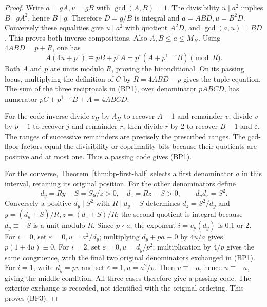 \begin{proof}
Write \(a=gA,u=gB\) with \(\gcd(A,B)=1\). The divisibility
\(u\mid a^2\) implies \(B\mid gA^2\), hence \(B\mid g\).
Therefore \(D=g/B\) is integral and \(a=ABD,u=B^2D\).
Conversely these equalities give \(u\mid a^2\) with quotient
\(A^2D\), and \(\gcd(a,u)=BD\). This proves both inverse
compositions. Also \(A,B\le a\le M_H\).
Using \(4ABD=p+R\), one has
\[
 A(4u+p^\varepsilon)
 \equiv pB+p^\varepsilon A
 =p^\varepsilon(A+p^{1-\varepsilon}B)\pmod R.
\]
Both \(A\) and \(p\) are units modulo \(R\), proving the
biconditional. On its passing locus, multiplying the definition of
\(C\) by \(R=4ABD-p\) gives the tuple equation. The sum of the
three reciprocals in (BP1), over denominator \(pABCD\), has numerator
\(pC+p^{1-\varepsilon}B+A=4ABCD\).

For the code inverse divide \(c_H\) by \(\Lambda_H\) to recover
\(A-1\) and remainder \(v\), divide \(v\) by \(p-1\) to recover
\(j\) and remainder \(r\), then divide \(r\) by 2 to recover
\(B-1\) and \(\varepsilon\). The ranges of successive remainders
are precisely the prescribed ranges. The gcd-floor factors equal
the divisibility or coprimality bits because their quotients are
positive and at most one. Thus a passing code gives (BP1).

For the converse, Theorem~\ref{thm:bp-first-half} selects a first
denominator \(a\) in this interval, retaining its original position.
For the other denominators define
\[
 d_y=Ry-S=Sy/z>0,\quad d_z=Rz-S>0,
 \qquad d_y d_z=S^2.
\]
Conversely a positive \(d_y\mid S^2\) with \(R\mid d_y+S\)
determines \(d_z=S^2/d_y\) and
\(y=(d_y+S)/R,z=(d_z+S)/R\); the second quotient is integral
because \(d_y\equiv-S\) is a unit modulo \(R\).
Since \(p\nmid a\), the exponent \(i=v_p(d_y)\) is 0,1 or 2.
For \(i=0\), set \(\varepsilon=0,u=a^2/d_y\); multiplying
\(d_y+pa\equiv0\) by \(4u/a\) gives \(p(1+4u)\equiv0\).
For \(i=2\), set \(\varepsilon=0,u=d_y/p^2\); multiplication
by \(4/p\) gives the same congruence, with the final two original
denominators exchanged in (BP1). For \(i=1\), write \(d_y=pv\)
and set \(\varepsilon=1,u=a^2/v\). Then \(v\equiv-a\), hence
\(u\equiv-a\), giving the middle condition. All three cases
therefore give a passing code. The exterior exchange is recorded,
not identified with the original ordering. This proves (BP3).
\end{proof}

